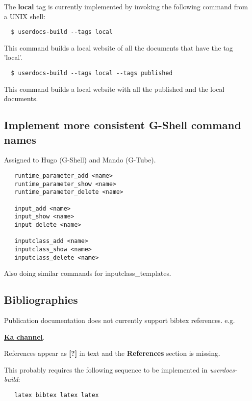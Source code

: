 \documentclass[12pt]{article}
\begin{document}
The {\bf local} tag is currently implemented by invoking the following
command from a UNIX shell:

\begin{verbatim}
  $ userdocs-build --tags local
\end{verbatim}

This command builds a local website of all the documents that have the
tag 'local'.

\begin{verbatim}
  $ userdocs-build --tags local --tags published
\end{verbatim}

This command builds a local website with all the published and the
local documents.

\subsection{Implement more consistent G-Shell command names}

Assigned to Hugo (G-Shell) and Mando (G-Tube).

\begin{verbatim}
   runtime_parameter_add <name>
   runtime_parameter_show <name>
   runtime_parameter_delete <name>

   input_add <name>
   input_show <name>
   input_delete <name>

   inputclass_add <name>
   inputclass_show <name>
   inputclass_delete <name>
\end{verbatim}

Also doing similar commands for inputclass\_templates.


\subsection{Bibliographies}

Publication documentation does not currently support bibtex references.
e.g.

\href{http://www.genesis-sim.org/userdocs/pub-purkinje-deschutter1-conductance1-ka1/pub-purkinje-deschutter1-conductance1-ka1.html}{\bf Ka channel}.

References appear as {\bf [?]} in text and the {\bf References} section is missing.

This probably requires the following sequence to be implemented in {\it userdocs-build}:
\begin{verbatim}
   latex bibtex latex latex
\end{verbatim}
\end{document}
